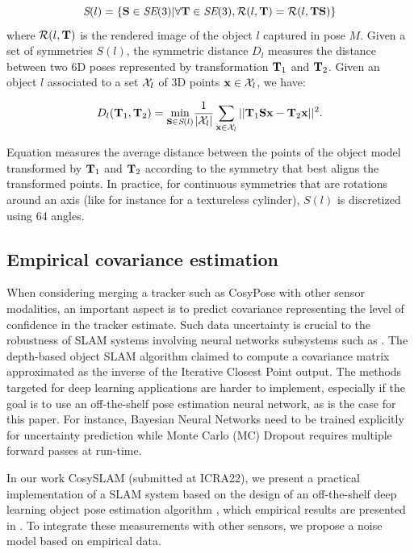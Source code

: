\begin{equation}
    \textit{S}(l) = \left \{ {\bf S} \in \textit{SE}(3) | \forall {\bf T} \in \textit{SE}(3), \mathcal{R}(l,{\bf T}) = \mathcal{R}(l,{\bf T} {\bf S})\right \}
\end{equation}
%
where $\mathcal{R}(l,{\bf T})$ is the rendered image of the object $l$ captured in pose $M$. Given a set of symmetries $S(l)$, 
the symmetric distance $D_l$ measures the distance between two 6D poses represented by transformation ${\bf T}_1$ and ${\bf T}_2$. 
Given an object $l$ associated to a set $\mathcal{X}_l$ of 3D points $\mathbf{x} \in \mathcal{X}_l$, we have:

\begin{equation}
    D_l({\bf T}_1, {\bf T}_2) = \underset{{\bf S} \in \textit{S}(l)}{\text{min}} \frac{1}{|\mathcal{X}_l|} \sum_{\mathbf{x} \in \mathcal{X}_l} ||{\bf T}_1 {\bf S} \mathbf{x} - {\bf T}_2\mathbf{x} ||^2.
    \label{eq:distSym}
\end{equation}

Equation  measures the average distance between the points of the object model transformed by ${\bf T}_1$ and ${\bf T}_2$ according to the symmetry 
that best aligns the transformed points. In practice, for continuous symmetries  that are rotations around an axis (like for instance for a textureless cylinder), 
$S(l)$ is discretized using 64 angles.


\subsection{Empirical covariance estimation}
\label{sec:cosypose_covariance}

When considering merging a tracker such as CosyPose with other sensor modalities, an important aspect is to predict covariance representing the level 
of confidence in the tracker estimate. Such data uncertainty is crucial to the robustness of SLAM systems involving neural networks 
subsystems such as \cite{yang2020d3vo}. The depth-based object SLAM algorithm \cite{SalasMoreno2013SLAMSL} claimed to compute a covariance matrix approximated 
as the inverse of the Iterative Closest Point output. The methods targeted for deep learning applications are harder to implement, especially if the goal 
is to use an off-the-shelf pose estimation neural network, as is the case for this paper. For instance, Bayesian Neural Networks \cite{jospin2020hands} 
need to be trained explicitly for uncertainty prediction while Monte Carlo (MC) Dropout \cite{gal2016dropout} requires multiple forward passes at run-time.

In our work CosySLAM \cite{debeunne2021cosyslam} (submitted at ICRA22), we present a practical implementation of a SLAM system based on the design of an off-the-shelf deep learning object 
pose estimation algorithm \cite{labbe2020cosypose}, which empirical results are presented in . 
To integrate these measurements with other sensors, we propose a noise model based on empirical data.

